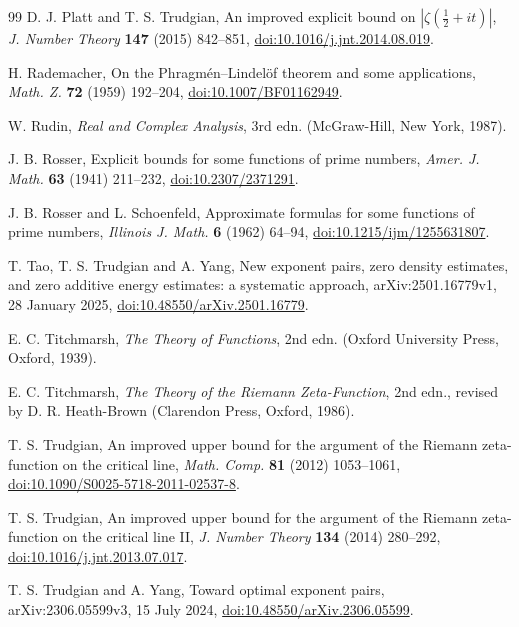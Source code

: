 \documentclass[11pt,reqno]{amsart}
\numberwithin{equation}{section}
\theoremstyle{definition}
\theoremstyle{remark}
\begin{document}
\begin{thebibliography}{99}
 D. J. Platt and T. S. Trudgian, An improved explicit bound on $|\zeta(\frac12+it)|$, \textit{J. Number Theory} \textbf{147} (2015) 842--851, \href{https://doi.org/10.1016/j.jnt.2014.08.019}{doi:10.1016/j.jnt.2014.08.019}.

 H. Rademacher, On the Phragm\'en--Lindel\"of theorem and some applications, \textit{Math. Z.} \textbf{72} (1959) 192--204, \href{https://doi.org/10.1007/BF01162949}{doi:10.1007/BF01162949}.

 W. Rudin, \textit{Real and Complex Analysis}, 3rd edn. (McGraw-Hill, New York, 1987).

 J. B. Rosser, Explicit bounds for some functions of prime numbers, \textit{Amer. J. Math.} \textbf{63} (1941) 211--232, \href{https://doi.org/10.2307/2371291}{doi:10.2307/2371291}.

 J. B. Rosser and L. Schoenfeld, Approximate formulas for some functions of prime numbers, \textit{Illinois J. Math.} \textbf{6} (1962) 64--94, \href{https://doi.org/10.1215/ijm/1255631807}{doi:10.1215/ijm/1255631807}.

 T. Tao, T. S. Trudgian and A. Yang, New exponent pairs, zero density estimates, and zero additive energy estimates: a systematic approach, arXiv:2501.16779v1, 28 January 2025, \href{https://doi.org/10.48550/arXiv.2501.16779}{doi:10.48550/arXiv.2501.16779}.

 E. C. Titchmarsh, \textit{The Theory of Functions}, 2nd edn. (Oxford University Press, Oxford, 1939).

 E. C. Titchmarsh, \textit{The Theory of the Riemann Zeta-Function}, 2nd edn., revised by D. R. Heath-Brown (Clarendon Press, Oxford, 1986).

 T. S. Trudgian, An improved upper bound for the argument of the Riemann zeta-function on the critical line, \textit{Math. Comp.} \textbf{81} (2012) 1053--1061, \href{https://doi.org/10.1090/S0025-5718-2011-02537-8}{doi:10.1090/S0025-5718-2011-02537-8}.

 T. S. Trudgian, An improved upper bound for the argument of the Riemann zeta-function on the critical line II, \textit{J. Number Theory} \textbf{134} (2014) 280--292, \href{https://doi.org/10.1016/j.jnt.2013.07.017}{doi:10.1016/j.jnt.2013.07.017}.

 T. S. Trudgian and A. Yang, Toward optimal exponent pairs, arXiv:2306.05599v3, 15 July 2024, \href{https://doi.org/10.48550/arXiv.2306.05599}{doi:10.48550/arXiv.2306.05599}.


\end{thebibliography}
\end{document}

